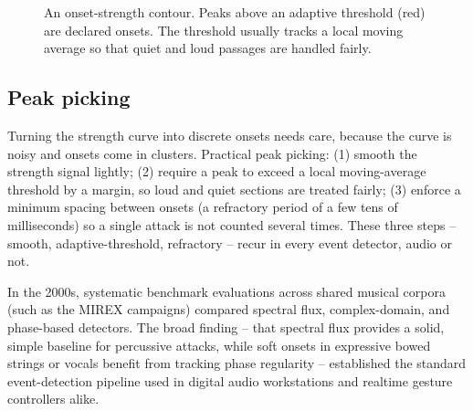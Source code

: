\begin{figure}[H]
\centering
{}
\caption{An onset-strength contour. Peaks above an adaptive threshold (red) are
declared onsets. The threshold usually tracks a local moving average so that quiet
and loud passages are handled fairly.}
\label{ch27:fig-onset}
\end{figure}

\subsection*{Peak picking}

Turning the strength curve into discrete onsets needs care, because the curve is
noisy and onsets come in clusters. Practical peak picking: (1) smooth the strength
signal lightly; (2) require a peak to exceed a local moving-average threshold by a
margin, so loud and quiet sections are treated fairly; (3) enforce a minimum
spacing between onsets (a refractory period of a few tens of milliseconds) so a
single attack is not counted several times. These three steps -- smooth,
adaptive-threshold, refractory -- recur in every event detector, audio or not.

\begin{applicationbox}
In the 2000s, systematic benchmark evaluations across shared musical corpora (such as
the MIREX campaigns) compared spectral flux, complex-domain, and phase-based detectors.
The broad finding -- that spectral flux provides a solid, simple
baseline for percussive attacks, while soft onsets in expressive bowed strings or vocals
benefit from tracking phase regularity -- established the standard event-detection
pipeline used in digital audio workstations and realtime gesture controllers alike.
\end{applicationbox}

